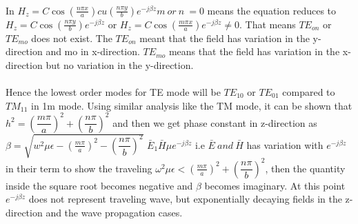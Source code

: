 	\paragraph{}
	In $H_z = C \cos (\frac{n\pi x}{a})cu(\frac{n\pi y}{b})e^{-j\beta z}m\ or\ n\ = 0$ means the equation reduces to $H_z = C \cos (\frac{n\pi y}{b})e^{-j\beta z}$ or $H_z = C \cos (\frac{m\pi x}{a})e^{-j\beta z} \neq 0$.  That means $TE_{on}$ or $TE_{mo}$ does not exist. The $TE_{on}$ meant that the field has variation in the y-direction and mo in x-direction. $TE_{mo}$ means that the field has variation in the x-direction but no variation in the y-direction.
	\paragraph{}Hence the lowest order modes for TE mode will be $TE_{10}$ or $TE_{01}$ compared to $TM_{11}$ in 1m mode. Using similar analysis like the TM mode, it can be shown that $h^2 =(\dfrac{m\pi}{a})^2 + (\dfrac{n\pi}{b})^2$ and then we get phase constant in z-direction as $\beta = \sqrt{w^2\mu\epsilon-(\frac{m\pi}{a})^2-(\dfrac{n\pi}{b})^2}$ $\bar{E}_1\bar{H}\mu e^{-j\beta z}$ i.e $\bar{E}\ and\ \bar{H}$ has variation with $e^{-j\beta z}$ in their term to show the traveling $\omega^2\mu\epsilon < (\frac{m\pi}{a})^2 + (\dfrac{n\pi}{b})^2$, then the quantity inside the square root becomes negative and $\beta$ becomes imaginary. At this point $e^{-j\beta z}$ does not represent traveling wave, but exponentially decaying fields in the z-direction and the wave propagation cases.
